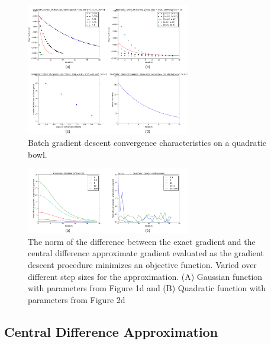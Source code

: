 \documentclass[10pt, twocolumn]{article}
\begin{document}
\begin{figure}
\caption{Batch gradient descent convergence characteristics on a quadratic bowl.}
\begin{center}
\includegraphics[width=270px]{all_quadratic_gd}
\end{center}
\label{fig:1.1_quad}
\end{figure}

\begin{figure}
\centering
\includegraphics[width=270px]{all_finite_difference}
\caption{The norm of the difference between the exact gradient and the central difference approximate gradient evaluated as the gradient descent procedure minimizes an objective function. Varied over different step sizes for the approximation. (A) Gaussian function with parameters from Figure 1d and (B) Quadratic function with parameters from Figure 2d}
\label{fig:1.2}
\end{figure}


\subsection{Central Difference Approximation}
\end{document}
